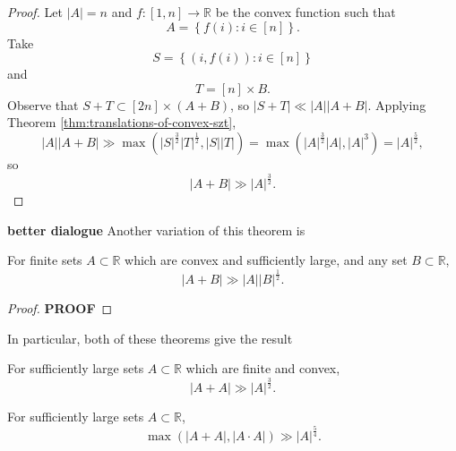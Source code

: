 \documentclass[12pt]{amsart}
\begin{document}
\begin{proof}
Let \(\left\lvert A \right\rvert = n\) and \(f : [1,n] \to \mathbb{R} \) be the convex function
such that
\[
    A = \left\{ f(i): i \in [n] \right\}
.\]
Take
\[
    S = \left\{ (i,f(i)) : i \in [n] \right\} 
\]
and
\[
    T = [n] \times B
.\]
Observe that \(S + T \subset [2n] \times (A + B)\), so \(\left\lvert S + T \right\rvert \ll \left\lvert A \right\rvert \left\lvert A + B \right\rvert \). Applying Theorem \ref{thm:translations-of-convex-szt},
\[
    \left\lvert A \right\rvert \left\lvert A + B \right\rvert \gg \max \left( \left\lvert S \right\rvert ^{\frac{3}{2} }\left\lvert T \right\rvert ^{\frac{1}{2} } , \left\lvert S \right\rvert \left\lvert T \right\rvert  \right) = \max \left( \left\lvert A \right\rvert ^{\frac{3}{2} }\left\lvert A \right\rvert , \left\lvert A \right\rvert ^{3} \right) = \left\lvert A \right\rvert ^{\frac{5}{2} }
,\]
so
\[
    \left\lvert A + B \right\rvert \gg \left\lvert A \right\rvert ^{\frac{3}{2} }
.\]
\end{proof}

\textbf{better dialogue}
Another variation of this theorem is

\begin{theorem}
For finite sets \(A \subset \mathbb{R} \) which are convex and sufficiently large, and
any set \(B \subset \mathbb{R} \),
\[
    \left\lvert A + B \right\rvert \gg \left\lvert A \right\rvert \left\lvert B \right\rvert ^{\frac{1}{2} }
.\]
\end{theorem}

\begin{proof}
\textbf{PROOF}
\end{proof}

In particular, both of these theorems give the result
\begin{theorem}
For sufficiently large sets \(A \subset \mathbb{R} \) which are finite and convex,
\[
    \left\lvert A+A \right\rvert \gg \left\lvert A \right\rvert ^{\frac{3}{2} }
.\]
\end{theorem}


\begin{theorem}
    For sufficiently large sets \(A \subset \mathbb{R} \),
    \[
        \max \left( \left\lvert A+A \right\rvert, \left\lvert A\cdot A \right\rvert  \right) \gg \left\lvert A \right\rvert ^{\frac{5}{4} }
    .\]
\end{theorem}
\end{document}
